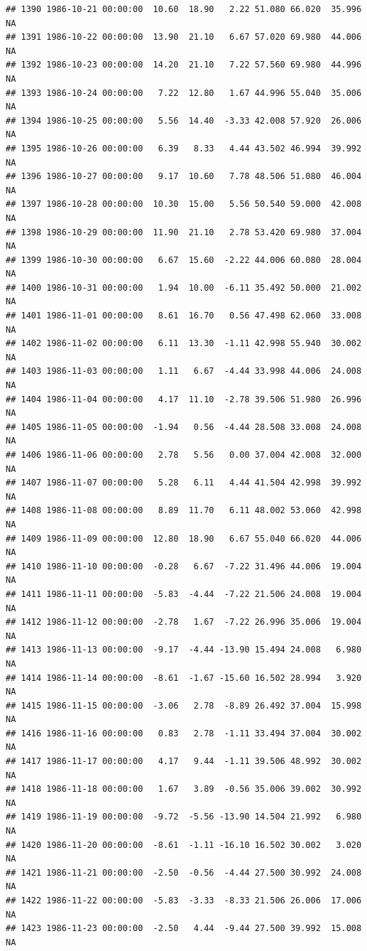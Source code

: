 \documentclass{article}\usepackage{graphicx, color}
\makeatletter
\newenvironment{kframe}{%
 \def\at@end@of@kframe{}%
 \ifinner\ifhmode%
  \def\at@end@of@kframe{\end{minipage}}%
  \begin{minipage}{\columnwidth}%
 \fi\fi%
 \def\FrameCommand##1{\hskip\@totalleftmargin \hskip-\fboxsep
 \colorbox{shadecolor}{##1}\hskip-\fboxsep
     \hskip-\linewidth \hskip-\@totalleftmargin \hskip\columnwidth}%
 \MakeFramed {\advance\hsize-\width
   \@totalleftmargin\z@ \linewidth\hsize
   \@setminipage}}%
 {\par\unskip\endMakeFramed%
 \at@end@of@kframe}
\newenvironment{knitrout}{}{} %
\makeatother
\begin{document}
\begin{knitrout}
\begin{kframe}
\begin{verbatim}
## 1390 1986-10-21 00:00:00  10.60  18.90   2.22 51.080 66.020  35.996     NA
## 1391 1986-10-22 00:00:00  13.90  21.10   6.67 57.020 69.980  44.006     NA
## 1392 1986-10-23 00:00:00  14.20  21.10   7.22 57.560 69.980  44.996     NA
## 1393 1986-10-24 00:00:00   7.22  12.80   1.67 44.996 55.040  35.006     NA
## 1394 1986-10-25 00:00:00   5.56  14.40  -3.33 42.008 57.920  26.006     NA
## 1395 1986-10-26 00:00:00   6.39   8.33   4.44 43.502 46.994  39.992     NA
## 1396 1986-10-27 00:00:00   9.17  10.60   7.78 48.506 51.080  46.004     NA
## 1397 1986-10-28 00:00:00  10.30  15.00   5.56 50.540 59.000  42.008     NA
## 1398 1986-10-29 00:00:00  11.90  21.10   2.78 53.420 69.980  37.004     NA
## 1399 1986-10-30 00:00:00   6.67  15.60  -2.22 44.006 60.080  28.004     NA
## 1400 1986-10-31 00:00:00   1.94  10.00  -6.11 35.492 50.000  21.002     NA
## 1401 1986-11-01 00:00:00   8.61  16.70   0.56 47.498 62.060  33.008     NA
## 1402 1986-11-02 00:00:00   6.11  13.30  -1.11 42.998 55.940  30.002     NA
## 1403 1986-11-03 00:00:00   1.11   6.67  -4.44 33.998 44.006  24.008     NA
## 1404 1986-11-04 00:00:00   4.17  11.10  -2.78 39.506 51.980  26.996     NA
## 1405 1986-11-05 00:00:00  -1.94   0.56  -4.44 28.508 33.008  24.008     NA
## 1406 1986-11-06 00:00:00   2.78   5.56   0.00 37.004 42.008  32.000     NA
## 1407 1986-11-07 00:00:00   5.28   6.11   4.44 41.504 42.998  39.992     NA
## 1408 1986-11-08 00:00:00   8.89  11.70   6.11 48.002 53.060  42.998     NA
## 1409 1986-11-09 00:00:00  12.80  18.90   6.67 55.040 66.020  44.006     NA
## 1410 1986-11-10 00:00:00  -0.28   6.67  -7.22 31.496 44.006  19.004     NA
## 1411 1986-11-11 00:00:00  -5.83  -4.44  -7.22 21.506 24.008  19.004     NA
## 1412 1986-11-12 00:00:00  -2.78   1.67  -7.22 26.996 35.006  19.004     NA
## 1413 1986-11-13 00:00:00  -9.17  -4.44 -13.90 15.494 24.008   6.980     NA
## 1414 1986-11-14 00:00:00  -8.61  -1.67 -15.60 16.502 28.994   3.920     NA
## 1415 1986-11-15 00:00:00  -3.06   2.78  -8.89 26.492 37.004  15.998     NA
## 1416 1986-11-16 00:00:00   0.83   2.78  -1.11 33.494 37.004  30.002     NA
## 1417 1986-11-17 00:00:00   4.17   9.44  -1.11 39.506 48.992  30.002     NA
## 1418 1986-11-18 00:00:00   1.67   3.89  -0.56 35.006 39.002  30.992     NA
## 1419 1986-11-19 00:00:00  -9.72  -5.56 -13.90 14.504 21.992   6.980     NA
## 1420 1986-11-20 00:00:00  -8.61  -1.11 -16.10 16.502 30.002   3.020     NA
## 1421 1986-11-21 00:00:00  -2.50  -0.56  -4.44 27.500 30.992  24.008     NA
## 1422 1986-11-22 00:00:00  -5.83  -3.33  -8.33 21.506 26.006  17.006     NA
## 1423 1986-11-23 00:00:00  -2.50   4.44  -9.44 27.500 39.992  15.008     NA

\end{verbatim}
\end{kframe}
\end{knitrout}
\end{document}
